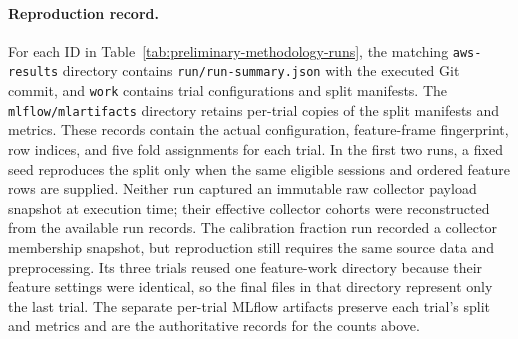 \paragraph{Reproduction record.}
For each ID in Table~\ref{tab:preliminary-methodology-runs}, the matching
\texttt{aws-results} directory contains \texttt{run/run-summary.json} with
the executed Git commit, and \texttt{work} contains trial configurations and
split manifests. The \texttt{mlflow/mlartifacts} directory retains per-trial
copies of the split manifests and metrics. These records contain the actual
configuration, feature-frame fingerprint, row indices, and five fold assignments
for each trial. In the first two runs, a fixed seed reproduces the split only
when the same eligible sessions and ordered feature rows are supplied. Neither
run captured an immutable raw collector payload snapshot at execution time;
their effective collector cohorts were reconstructed from the available run
records. The calibration fraction run recorded a collector membership snapshot,
but reproduction still requires the same source data and preprocessing. Its
three trials reused one feature-work directory because their feature settings
were identical, so the final files in that directory represent only the last
trial. The separate per-trial MLflow artifacts preserve each trial's split and
metrics and are the authoritative records for the counts above.
